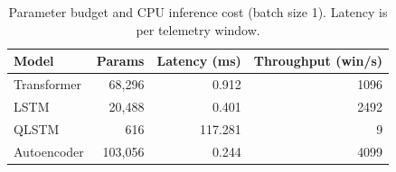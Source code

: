 \begin{table}[t]
\centering
\caption{Parameter budget and CPU inference cost (batch size 1). Latency is per telemetry window.}
\label{tab:efficiency}
\begin{tabular}{lrrr}
\toprule
Model & Params & Latency (ms) & Throughput (win/s) \\
\midrule
Transformer & 68,296 & 0.912 & 1096 \\
LSTM & 20,488 & 0.401 & 2492 \\
QLSTM & 616 & 117.281 & 9 \\
Autoencoder & 103,056 & 0.244 & 4099 \\
\bottomrule
\end{tabular}
\end{table}
